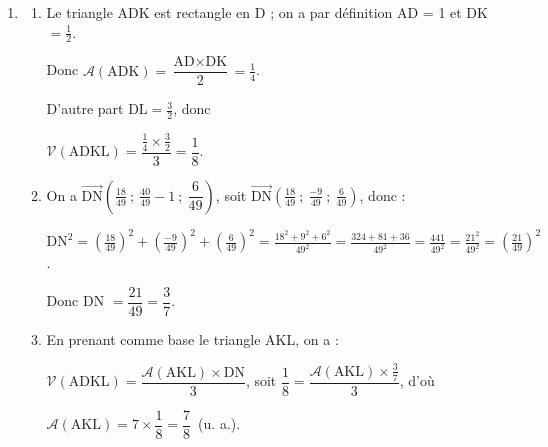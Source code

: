 \documentclass[10pt]{article}
\providecommand{\vect}[1]{\overrightarrow{#1}}
\begin{document}
\begin{enumerate}
\begin{enumerate}
\renewcommand\arraystretch{1.8}
$\left\{\begin{array}{l c r}
x		&=&6\times \dfrac{3}{49}\\
y		&=&1-3\times\dfrac{3}{49}\\
z		&=&2\times \dfrac{3}{49}
\end{array}\right. \iff \left\{\begin{array}{l c r}
x		&=&\dfrac{18}{49}\\
y		&=&\dfrac{40}{49}\\
z		&=&\dfrac{6}{49}
\end{array}\right.$.
\renewcommand\arraystretch{1}
Conclusion : N$\left(\dfrac{18}{49}~;~\dfrac{40}{49}~;~\dfrac{6}{49} \right)$.
	\end{enumerate}







\item 
	\begin{enumerate}
		\item Le triangle ADK est rectangle en D ; on a par définition AD = 1 et DK $=  \frac{1}{2}$.

Donc $\mathcal{A}(\text{ADK}) = \dfrac{\text{AD} \times \text{DK}}{2} = \frac{1}{4}$.

D'autre part $\text{DL} = \frac{3}{2}$, donc 

$\mathcal{V}(\text{ADKL}) = \dfrac{\frac{1}{4} \times \frac{3}{2}}{3} = \dfrac{1}{8}$.
		\item 
On a $\vect{\text{DN}}\left(\frac{18}{49}~;~\frac{40}{49} - 1~;~\dfrac{6}{49} \right)$, soit  $\vect{\text{DN}}\left(\frac{18}{49}~;~\frac{- 9}{49}~;~\frac{6}{49} \right)$, donc :

$\text{DN}^2 = \left(\frac{18}{49}\right)^2 + \left(\frac{-9}{49}\right)^2  + \left(\frac{6}{49}\right)^2 = \frac{18^2 + 9^2 + 6^2}{49^2} = \frac{324 + 81 + 36}{49^2} = \frac{441}{49^2} = \frac{21^2}{49^2} = \left(\frac{21}{49}\right)^2$. 

Donc DN $ = \dfrac{21}{49} = \dfrac{3}{7}$.
		\item 
	En prenant comme base le triangle AKL, on a :
	
$\mathcal{V}(\text{ADKL}) = \dfrac{\mathcal{A}(\text{AKL}) \times \text{DN}}{3}$, soit $\dfrac{1}{8} = \dfrac{\mathcal{A}(\text{AKL}) \times \frac{3}{7}}{3}$, d'où 

$\mathcal{A}(\text{AKL}) = 7 \times \dfrac{1}{8} = \dfrac{7}{8}$~(u. a.).
	\end{enumerate}
\end{enumerate}

\bigskip
\end{document}
